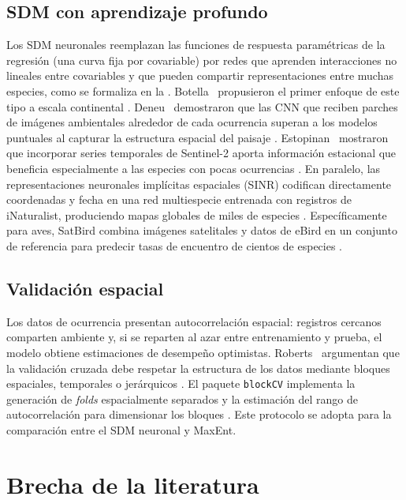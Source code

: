 \subsection*{SDM con aprendizaje profundo}

Los SDM neuronales reemplazan las funciones de respuesta paramétricas de la
regresión (una curva fija por covariable) por redes que aprenden
interacciones no lineales entre covariables y que pueden compartir
representaciones entre muchas especies, como se formaliza en la
. Botella \etal\ propusieron
el primer enfoque de este tipo a escala continental \citep{botella2018deepsdm}.
Deneu \etal\ demostraron que las CNN que reciben parches de imágenes
ambientales alrededor de cada ocurrencia superan a los modelos puntuales al
capturar la estructura espacial del paisaje \citep{deneu2021cnn}.
Estopinan \etal\ mostraron que incorporar series temporales de Sentinel-2
aporta información estacional que beneficia especialmente a las especies con
pocas ocurrencias \citep{estopinan2022sentinel}. En paralelo, las
representaciones neuronales implícitas espaciales (SINR) codifican
directamente coordenadas y fecha en una red multiespecie entrenada con
registros de iNaturalist, produciendo mapas globales de miles de especies
\citep{cole2023sinr}. Específicamente para aves, SatBird combina imágenes
satelitales y datos de eBird en un conjunto de referencia para predecir tasas
de encuentro de cientos de especies \citep{teng2024satbird}.

\subsection*{Validación espacial}

Los datos de ocurrencia presentan autocorrelación espacial: registros
cercanos comparten ambiente y, si se reparten al azar entre entrenamiento y
prueba, el modelo obtiene estimaciones de desempeño optimistas. Roberts
\etal\ argumentan que la validación cruzada debe respetar la estructura de
los datos mediante bloques espaciales, temporales o jerárquicos
\citep{roberts2017crossvalidation}. El paquete \texttt{blockCV} implementa
la generación de \textit{folds} espacialmente separados y la estimación del rango de
autocorrelación para dimensionar los bloques \citep{valavi2019blockcv}. Este
protocolo se adopta para la comparación entre el SDM neuronal y MaxEnt.

\section{Brecha de la literatura}\label{sec:brecha}

